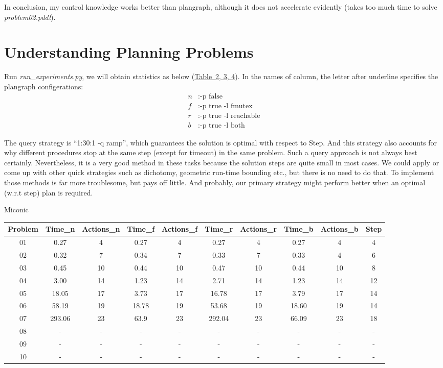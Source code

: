 \documentclass{article}
\begin{document}
In conclusion, my control knowledge works better than plangraph, although it does not accelerate evidently (takes too much time to solve \emph{problem02.pddl}).

\section{Understanding Planning Problems}
Run \emph{run\_experiments.py}, we will obtain statistics as below (\hyperref[tab-3]{Table~2, 3, 4}). In the names of column, the letter after underline specifies the plangraph configerations:
\begin{align*}
	n&: \text{-p false} \\
	f&: \text{-p true -l fmutex} \\
	r&: \text{-p true -l reachable} \\
	b&: \text{-p true -l both}
\end{align*}

The query strategy is ``1:30:1 -q ramp'', which guarantees the solution is optimal with respect to Step. And this strategy also accounts for why different procedures stop at the same step (except for timeout) in the same problem. Such a query approach is not always best certainly. Nevertheless, it is a very good method in these tasks because the solution steps are quite small in most cases. We could apply or come up with other quick strategies such as dichotomy, geometric run-time bounding etc., but there is no need to do that. To implement those methods is far more troublesome, but pays off little. And probably, our primary strategy might perform better when an optimal (w.r.t step) plan is required.

\begin{center}
\Large Miconic
\label{tab-2}
\small
\begin{tabular}{cccccccccc}
\toprule
Problem & Time\_n & Actions\_n & Time\_f & Actions\_f & Time\_r & Actions\_r & Time\_b & Actions\_b & Step \\
\midrule
01 & 0.27 & 4 & 0.27 & 4 & 0.27 & 4 & 0.27 & 4 & 4 \\
02 & 0.32 & 7 & 0.34 & 7 & 0.33 & 7 & 0.33 & 4 & 6 \\
03 & 0.45 & 10 & 0.44 & 10 & 0.47 & 10 & 0.44 & 10 & 8 \\
04 & 3.00 & 14 & 1.23 & 14 & 2.71 & 14 & 1.23 & 14 & 12 \\
05 & 18.05 & 17 & 3.73 & 17 & 16.78 & 17 & 3.79 & 17 & 14 \\
06 & 58.19 & 19 & 18.78 & 19 & 53.68 & 19 & 18.60 & 19 & 14 \\
07 & 293.06 & 23 & 63.9 & 23 & 292.04 & 23 & 66.09 & 23 & 18 \\
08 & - & - & - & - & - & - & - & - & - \\
09 & - & - & - & - & - & - & - & - & - \\
10 & - & - & - & - & - & - & - & - & - \\
\bottomrule
\end{tabular}
\end{center}
\end{document}
